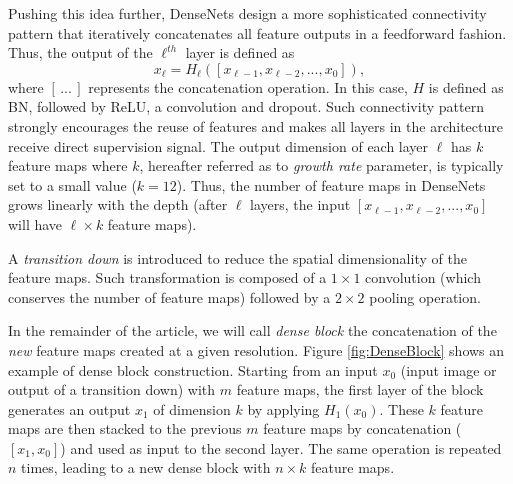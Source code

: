 \documentclass[10pt,twocolumn,letterpaper]{article}
\begin{document}
Pushing this idea further, DenseNets \cite{DenseNet2016} design a more sophisticated connectivity pattern that iteratively concatenates all feature outputs in a feedforward fashion. Thus, the output of the $\ell^{th}$ layer is defined as
\begin{equation}
x_\ell = H_\ell([x_{\ell-1},x_{\ell-2},...,x_0]),
\end{equation}
where $[\,... \,]$ represents the concatenation operation. In this case, $H$ is defined as BN, followed by ReLU, a convolution and dropout. Such connectivity pattern strongly encourages the reuse of features and makes all layers in the architecture receive direct supervision signal. The output dimension of each layer $\ell$ has $k$ feature maps where $k$, hereafter referred as to \emph{growth rate} parameter, is typically set to a small value (\eg $k=12$). Thus, the number of feature maps in DenseNets grows linearly with the depth (\eg after $\ell$ layers, the input $[x_{\ell-1},x_{\ell-2},...,x_0]$ will have $\ell \times k$ feature maps). 

A \emph{transition down} is introduced to reduce the spatial dimensionality of the feature maps. Such transformation is composed of a $1\times1$ convolution (which conserves the number of feature maps) followed by a $2\times2$ pooling operation. 

In the remainder of the article, we will call \emph{dense block} the concatenation of the \emph{new} feature maps created at a given resolution. Figure \ref{fig:DenseBlock} shows an example of dense block construction. Starting from an input $x_0$ (input image or output of a transition down) with $m$ feature maps, the first layer of the block generates an output $x_1$ of dimension $k$ by applying $H_1(x_0)$. These $k$ feature maps are then stacked to the previous $m$ feature maps by concatenation ($[x_1, x_0]$) and used as input to the second layer. The same operation is repeated $n$ times, leading to a new dense block with $n \times k$ feature maps.
\end{document}
